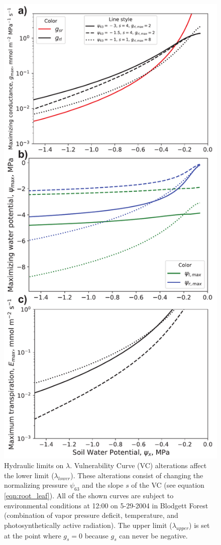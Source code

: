 \documentclass[utf8]{frontiersSCNS} %
\begin{document}
\begin{figure}[h]
    \begin{center}
        \includegraphics[scale=0.5]{g_psi_E_psix.pdf}
    \end{center}
    \caption{Hydraulic limits on $\lambda$. Vulnerability Curve (VC) alterations affect the lower limit ($\lambda_{lower}$). These alterations consist of changing the normalizing pressure $\psi_{63}$ and the slope $s$ of the VC (see equation \ref{eqn:root_leaf}). All of the shown curves are subject to environmental conditions at 12:00 on 5-29-2004 in Blodgett Forest (combination of vapor pressure deficit, temperature, and photosynthetically active radiation). The upper limit ($\lambda_{upper}$) is set at the point where $g_s=0$ because $g_s$ can never be negative.}
    \label{fig:gmax_Emax_psix}
\end{figure}
\end{document}
